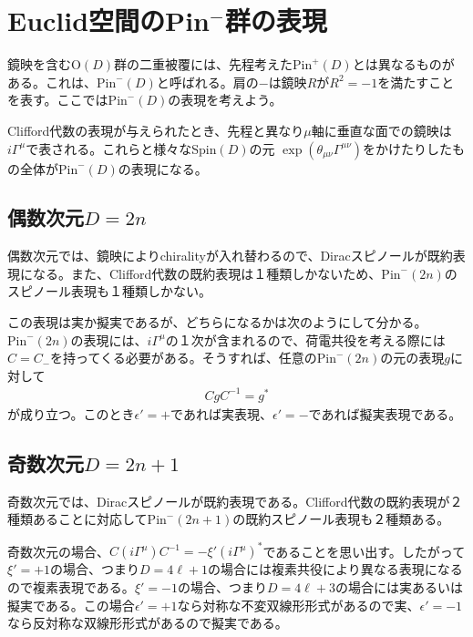 \documentclass[12pt,a4paper,dvipdfmx]{jlreq}
\newcommand{\Pin}{\mathrm{Pin}^{+}}
\newcommand{\Pim}{\mathrm{Pin}^{-}}
\begin{document}
\section{Euclid空間のPin\texorpdfstring{${}^{-}$}{−}群の表現}
鏡映を含むO$(D)$群の二重被覆には、先程考えた$\Pin(D)$とは異なるものがある。これは、$\Pim(D)$と呼ばれる。肩の$-$は鏡映$R$が$R^2=-1$を満たすことを表す。ここでは$\Pim(D)$の表現を考えよう。

Clifford代数の表現が与えられたとき、先程と異なり$\mu$軸に垂直な面での鏡映は$i\Gamma^{\mu}$で表される。これらと様々なSpin$(D)$の元
$\exp(\theta_{\mu\nu}\Gamma^{\mu\nu})$をかけたりしたもの全体が$\Pim(D)$の表現になる。

\subsection{偶数次元$D=2n$}
偶数次元では、鏡映によりchiralityが入れ替わるので、Diracスピノールが既約表現になる。また、Clifford代数の既約表現は１種類しかないため、$\Pim(2n)$のスピノール表現も１種類しかない。

この表現は実か擬実であるが、どちらになるかは次のようにして分かる。$\Pim(2n)$の表現には、$i\Gamma^{\mu}$の１次が含まれるので、荷電共役を考える際には$C=C_{-}$を持ってくる必要がある。そうすれば、任意の$\Pim(2n)$の元の表現$g$に対して
\begin{align*}
  CgC^{-1}=g^*
\end{align*}
が成り立つ。このとき$\epsilon'=+$であれば実表現、$\epsilon'=-$であれば擬実表現である。

\subsection{奇数次元$D=2n+1$}
奇数次元では、Diracスピノールが既約表現である。Clifford代数の既約表現が２種類あることに対応して$\Pim(2n+1)$の既約スピノール表現も２種類ある。

奇数次元の場合、$C (i\Gamma^{\mu})C^{-1}=-\xi' (i\Gamma^{\mu})^*$であることを思い出す。したがって$\xi'=+1$の場合、つまり$D=4\ell+1$の場合には複素共役により異なる表現になるので複素表現である。$\xi'=-1$の場合、つまり$D=4\ell+3$の場合には実あるいは擬実である。この場合$\epsilon'=+1$なら対称な不変双線形形式があるので実、$\epsilon'=-1$なら反対称な双線形形式があるので擬実である。
\end{document}
